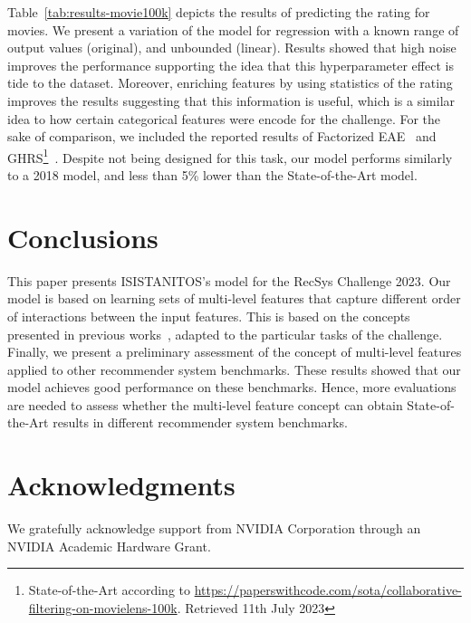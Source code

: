 \documentclass[manuscript,nonacm]{acmart}
\begin{document}
Table~\ref{tab:results-movie100k} depicts the results of predicting the rating for movies. We present a variation of the model for regression with a known range of output values (original), and unbounded (linear). Results showed that high noise improves the performance supporting the idea that this hyperparameter effect is tide to the dataset. Moreover, enriching features by using statistics of the rating improves the results suggesting that this information is useful, which is a similar idea to how certain categorical features were encode for the challenge. For the sake of comparison, we included the reported results of Factorized EAE~\cite{dmias2018} and GHRS\footnote{State-of-the-Art according to \url{https://paperswithcode.com/sota/collaborative-filtering-on-movielens-100k}. Retrieved 11th July 2023}~\cite{GHRS2022}. Despite not being designed for this task, our model performs similarly to a 2018 model, and less than 5\% lower than the State-of-the-Art model.  

















\section{Conclusions}\label{sec:conclusions}

This paper presents ISISTANITOS's model for the RecSys Challenge 2023. 
Our model is based on learning sets of multi-level features that capture different order of interactions between the input features.
This is based on the concepts presented in previous works~\cite{wdlrs16, deepfm17}, adapted to the particular tasks of the challenge. Finally, we present a preliminary assessment of the concept of multi-level features applied to other recommender system benchmarks.
These results showed that our model achieves good performance on these benchmarks. Hence, more evaluations are needed to assess whether the multi-level feature concept can obtain State-of-the-Art results in different recommender system benchmarks.

\section*{Acknowledgments}
We gratefully acknowledge support from NVIDIA Corporation through an NVIDIA Academic Hardware Grant.




\end{document}
